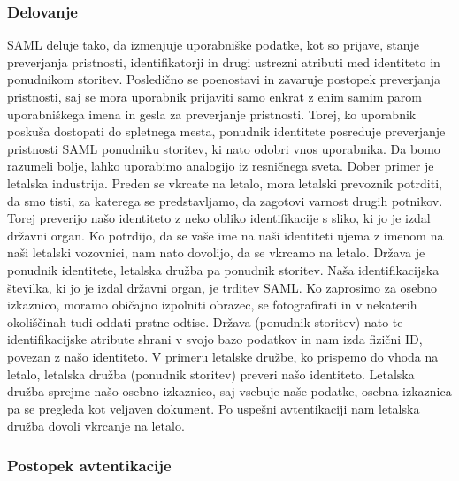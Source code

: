\documentclass[a4paper,12pt,openright,oneside]{book}
\begin{document}
\subsubsection{Delovanje}
SAML deluje tako, da izmenjuje uporabniške podatke, kot so prijave, stanje preverjanja pristnosti, identifikatorji in drugi ustrezni atributi med identiteto in ponudnikom storitev. Posledično se poenostavi in zavaruje postopek preverjanja pristnosti, saj se mora uporabnik prijaviti samo enkrat z enim samim parom uporabniškega imena in gesla za preverjanje pristnosti. Torej, ko uporabnik poskuša dostopati do spletnega mesta, ponudnik identitete posreduje preverjanje pristnosti SAML ponudniku storitev, ki nato odobri vnos uporabnika. Da bomo razumeli bolje, lahko uporabimo analogijo iz resničnega sveta.
\newline
Dober primer je letalska industrija. Preden se vkrcate na letalo, mora letalski prevoznik potrditi, da smo tisti, za katerega se predstavljamo, da zagotovi varnost drugih potnikov. Torej preverijo našo identiteto z neko obliko identifikacije s sliko, ki jo je izdal državni organ. Ko potrdijo, da se vaše ime na naši identiteti ujema z imenom na naši letalski vozovnici, nam nato dovolijo, da se vkrcamo na letalo.
\newline
Država je ponudnik identitete, letalska družba pa ponudnik storitev. Naša identifikacijska številka, ki jo je izdal državni organ, je trditev SAML. Ko zaprosimo za osebno izkaznico, moramo običajno izpolniti obrazec, se fotografirati in v nekaterih okoliščinah tudi oddati prstne odtise. Država (ponudnik storitev) nato te identifikacijske atribute shrani v svojo bazo podatkov in nam izda fizični ID, povezan z našo identiteto. V primeru letalske družbe, ko prispemo do vhoda na letalo, letalska družba (ponudnik storitev) preveri našo identiteto. Letalska družba sprejme našo osebno izkaznico, saj vsebuje naše podatke, osebna izkaznica pa se pregleda kot veljaven dokument. Po uspešni avtentikaciji nam letalska družba dovoli vkrcanje na letalo.

\subsubsection{Postopek avtentikacije}
\end{document}
